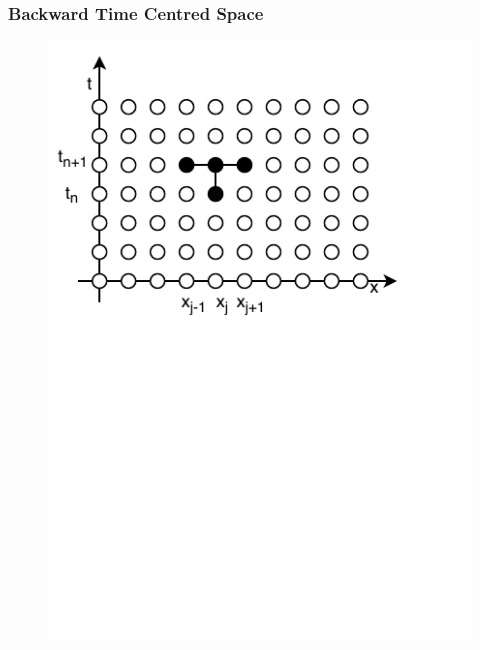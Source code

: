     \subsubsection*{Backward Time Centred Space}
        \begin{figure}
        \centering
        \includegraphics[width=0.7\linewidth, trim={0 5cm 0 0}, clip]{Figures/BTCS}
        \caption{}
        \label{fig:BTCSmesh}
    \end{figure}
    
